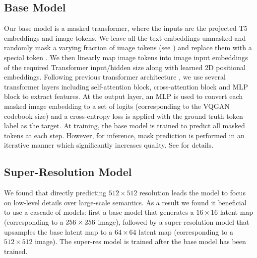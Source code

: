 \subsection{Base Model}

Our base model is a masked transformer\citep{vaswani2017attention,bert}, where the inputs are the projected T5 embeddings and image tokens. We leave all the text embeddings unmasked and randomly mask a varying fraction of image tokens  (see ) and replace them with a special \mask token \citep{maskgit}.
We then linearly map image tokens into image input embeddings of the required Transformer input/hidden size along with learned 2D positional embeddings. Following previous transformer architecture \citep{vaswani2017attention},  we use several transformer layers including self-attention block, cross-attention block and MLP block to extract features. At the output layer, an MLP is used to convert each masked image embedding to a set of logits (corresponding to the VQGAN codebook size) and a cross-entropy loss is applied with the ground truth token label as the target. At training, the base model is trained to predict all masked tokens at each step. However, for inference, mask prediction is performed in an iterative manner which significantly increases quality. See  for details.

\subsection{Super-Resolution Model}

 
We found that directly predicting $512\times512$ resolution leads the model to focus on low-level details over large-scale semantics. As a result we found it beneficial to use a cascade of models: first a base model that generates a $16\times16$ latent map (corresponding to a $256 \times 256$ image), followed by a super-resolution model that upsamples the base latent map to a $64\times64$ latent map (corresponding to a $512\times512$ image). The super-res model is trained after the base model has been trained.

